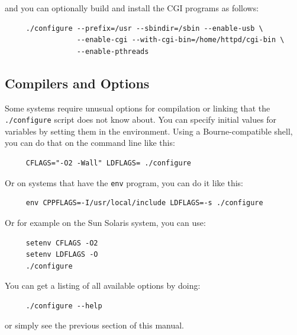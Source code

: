 and you can optionally build and install the CGI programs as follows: 

\footnotesize
\begin{verbatim}
     ./configure --prefix=/usr --sbindir=/sbin --enable-usb \
                 --enable-cgi --with-cgi-bin=/home/httpd/cgi-bin \
                 --enable-pthreads
\end{verbatim}
\normalsize

\label{Compilers-and-Options}

\subsection*{Compilers and Options}
\index{Compilers and Options }

\label{index-compiler-options-30}
Some systems require unusual options for compilation or linking that the {\tt
./configure} script does not know about. You can specify initial values for
variables by setting them in the environment. Using a Bourne-compatible shell,
you can do that on the command line like this: 

\footnotesize
\begin{verbatim}
     CFLAGS="-O2 -Wall" LDFLAGS= ./configure
\end{verbatim}
\normalsize

Or on systems that have the {\tt env} program, you can do it like this: 

\footnotesize
\begin{verbatim}
     env CPPFLAGS=-I/usr/local/include LDFLAGS=-s ./configure
\end{verbatim}
\normalsize

Or for example on the Sun Solaris system, you can use: 

\footnotesize
\begin{verbatim}
     setenv CFLAGS -O2
     setenv LDFLAGS -O
     ./configure
\end{verbatim}
\normalsize

You can get a listing of all available options by doing: 

\footnotesize
\begin{verbatim}
     ./configure --help
\end{verbatim}
\normalsize

or simply see the previous section of this manual. 

\label{Operating-System-Specifics}

